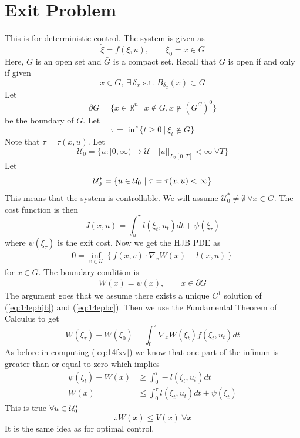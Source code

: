 \section{Exit Problem}
This is for deterministic control.
The system is given as
$$\dot{\xi} = f(\xi,u), \qquad \xi_0 = x\in G$$
Here, $G$ is an open set and $\bar{G}$ is a compact set.
Recall that $G$ is open if and only if given
$$x\in G,~\exists~\delta_x \text{~s.t.~} B_{\delta_x}(x)\subset G$$
Let
$$\partial G = \{x\in\mathbb{R}^n~|~x\notin G, x\notin{(G^C)}^0\}$$
be the boundary of $G$.
Let
$$\tau = \inf\{t\geq 0~|~\xi_t\notin G\}$$
Note that $\tau=\tau(x,u)$.
Let
$$\mathcal{U}_0 = \{u:[0,\infty)\to\mathcal{U}~|~||u||_{L_2[0,T]}<\infty~\forall T\}$$%
Let
$$\mathcal{U}_0^\ast = \{u\in\mathcal{U}_0~|~\tau=\tau(x,u)<\infty\}$$
This means that the system is controllable.
We will assume $\mathcal{U}_0^\ast\neq\emptyset~\forall x\in G$.
The cost function is then
$$J(x,u) = \int_u^\tau l(\xi_t,u_t)dt + \psi(\xi_\tau)$$
where $\psi(\xi_\tau)$ is the exit cost.
Now we get the HJB PDE as
\begin{align}
\label{eq:14ephjb}
0 = \inf_{v\in\mathcal{U}} \left\lbrace f(x,v)\cdot\nabla_x W(x) + l(x,u) \right\rbrace
\end{align}
for $x\in G$.
The boundary condition is
\begin{align}
\label{eq:14epbc}
W(x) = \psi(x), \qquad x\in\partial G
\end{align}
The argument goes that we assume there exists a unique $C^1$ solution of (\ref{eq:14ephjb}) and (\ref{eq:14epbc}).
Then we use the Fundamental Theorem of Calculus to get
$$W(\xi_\tau) - W(\xi_0) = \int_0^\tau \nabla_x W(\xi_t)f(\xi_t,u_t)dt$$
As before in computing (\ref{eq:14fxv}) we know that one part of the infinum is greater than or equal to zero which implies
\begin{align*}
\psi(\xi_t) - W(x) &\geq \int_0^\tau -l(\xi_t,u_t)dt \\
W(x) &\leq \int_0^\tau l(\xi_t,u_t)dt + \psi(\xi_t)
\end{align*}
This is true $\forall u\in\mathcal{U}_0^\ast$
$$\therefore W(x)\leq V(x)~\forall x$$
It is the same idea as for optimal control.

